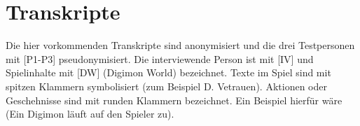 \section{Transkripte}
Die hier vorkommenden Transkripte sind anonymisiert und die drei Testpersonen mit [P1-P3] pseudonymisiert. Die interviewende Person ist mit [IV] und Spielinhalte mit [DW] (Digimon World) bezeichnet. Texte im Spiel sind mit spitzen Klammern symbolisiert (zum Beispiel \frq D. Vetrauen\flq{}). Aktionen oder Geschehnisse sind mit runden Klammern bezeichnet. Ein Beispiel hierfür wäre (Ein Digimon läuft auf den Spieler zu).
